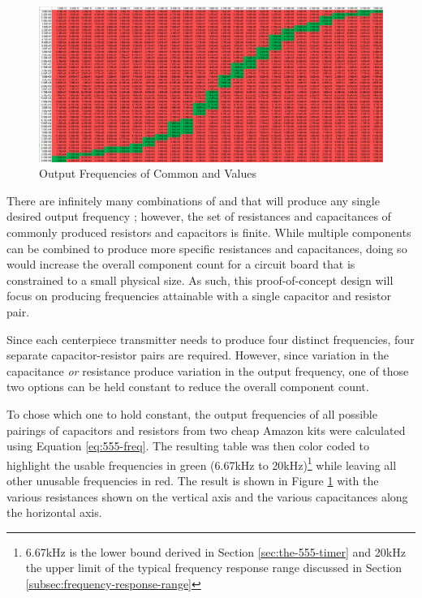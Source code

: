 \begin{figure}
    \centering
    \caption{Output Frequencies of Common  and  Values}
    \label{fig:freq-selection}
    \includegraphics[width=\linewidth]{Figures/6 PCB Design/freq_selection.png}
\end{figure}

There are infinitely many combinations of  and  that
will produce any single desired output frequency ; however, the
set of resistances and capacitances of commonly produced resistors and
capacitors is finite. While multiple components can be combined to
produce more specific resistances and capacitances, doing so would
increase the overall component count for a circuit board that is
constrained to a small physical size. As such, this proof-of-concept
design will focus on producing frequencies attainable with a single
capacitor and resistor pair.

Since each centerpiece transmitter needs to produce four distinct
frequencies, four separate capacitor-resistor pairs are required.
However, since variation in the capacitance \emph{or} resistance
produce variation in the output frequency, one of those two options can
be held constant to reduce the overall component count.

To chose which one to hold constant, the output frequencies of all
possible pairings of capacitors and resistors from two cheap Amazon
kits \cite{amazon-capacitors} \cite{amazon-resistors} were calculated
using Equation \ref{eq:555-freq}. The resulting table was then color
coded to highlight the usable frequencies in green (6.67kHz to
20kHz)\footnote{6.67kHz is the lower bound derived in Section
\ref{sec:the-555-timer} and 20kHz the upper limit of the typical
frequency response range discussed in Section
\ref{subsec:frequency-response-range}} while leaving all other unusable
frequencies in red. The result is shown in Figure
\ref{fig:freq-selection} with the various resistances shown on the
vertical axis and the various capacitances along the horizontal axis.

